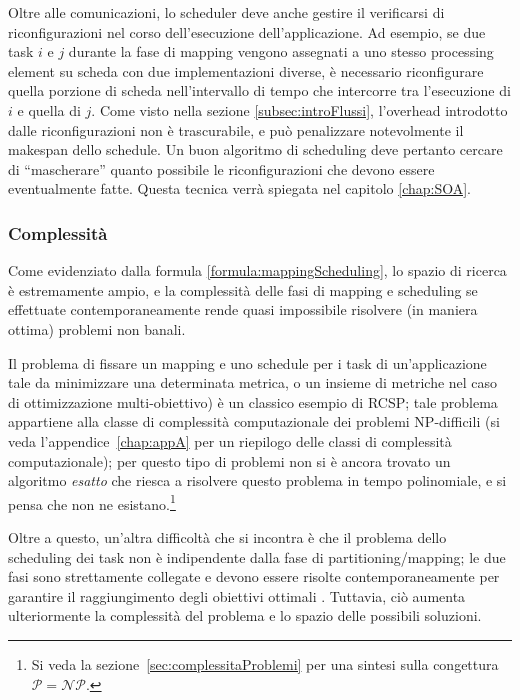Oltre alle comunicazioni, lo scheduler deve anche gestire il verificarsi di 
riconfigurazioni nel corso dell'esecuzione dell'applicazione. Ad esempio, se due task $i$ 
e $j$ durante la fase di mapping vengono assegnati a uno stesso processing element su 
scheda con due implementazioni diverse, è necessario riconfigurare quella porzione di 
scheda nell'intervallo di tempo che intercorre tra l'esecuzione di $i$ e quella di $j$.
Come visto nella sezione \ref{subsec:introFlussi}, l'overhead introdotto dalle riconfigurazioni
non \`e trascurabile, e pu\`o penalizzare notevolmente il makespan dello schedule.
Un buon algoritmo di scheduling deve pertanto cercare di ``mascherare'' quanto possibile le
riconfigurazioni che devono essere eventualmente fatte. Questa tecnica verr\`a spiegata nel capitolo
\ref{chap:SOA}.

\subsubsection{Complessità}
Come evidenziato dalla formula \eqref{formula:mappingScheduling}, lo spazio di ricerca è 
estremamente ampio, e la complessità delle fasi di mapping e scheduling se effettuate 
contemporaneamente rende quasi impossibile risolvere (in maniera ottima) problemi non 
banali.

Il problema di fissare un mapping e uno schedule per i task di un'applicazione
tale da minimizzare una determinata metrica, o un insieme di metriche nel caso
di ottimizzazione multi-obiettivo) è un classico esempio di \ac{RCSP}; tale
problema appartiene alla classe di complessità computazionale dei problemi
NP-difficili (si veda l'appendice~\ref{chap:appA} per un riepilogo delle classi
di complessità computazionale); per questo tipo di problemi non si è ancora
trovato un algoritmo \emph{esatto} che riesca a risolvere questo problema in
tempo polinomiale, e si pensa che non ne esistano.\footnote{Si veda la
  sezione~\ref{sec:complessitaProblemi} per una sintesi sulla congettura
  $\mathcal{P} = \mathcal{NP}$.}

Oltre a questo, un'altra difficoltà che si incontra è che il problema dello
scheduling dei task non è indipendente dalla fase di partitioning/mapping; le
due fasi sono strettamente collegate e devono essere risolte contemporaneamente
per garantire il raggiungimento degli obiettivi ottimali
\cite{AntColonyOptimization}. Tuttavia, ciò aumenta ulteriormente la
complessità del problema e lo spazio delle possibili soluzioni.


